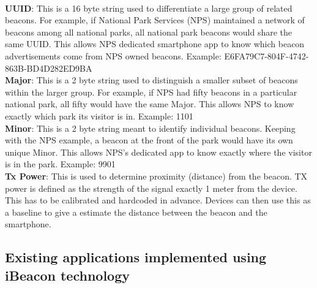 \documentclass[12pt]{article}
\begin{document}
\paragraph{} 
\textbf{UUID}: This is a 16 byte string used to differentiate a large group of related beacons. For example, if National Park Services (NPS) maintained a network of beacons among all national parks, all national park beacons would share the same UUID. This allows NPS dedicated smartphone app to know which beacon advertisements come from NPS owned beacons. Example: E6FA79C7-804F-4742-863B-BD4D282ED9BA \\

\textbf{Major}: This is a 2 byte string used to distinguish a smaller subset of beacons within the larger group. For example, if NPS had fifty beacons in a particular national park, all fifty would have the same Major. This allows NPS to know exactly which park its visitor is in. Example: 1101  \\

\textbf{Minor}: This is a 2 byte string meant to identify individual beacons. Keeping with the NPS example, a beacon at the front of the park would have its own unique Minor. This allows NPS’s dedicated app to know exactly where the visitor is in the park. Example: 9901\\

\textbf{Tx Power}: This is used to determine proximity (distance) from the beacon. TX power is defined as the strength of the signal exactly 1 meter from the device. This has to be calibrated and hardcoded in advance. Devices can then use this as a baseline to give a estimate the distance between the beacon and the smartphone.  \\

\subsection{Existing applications implemented using iBeacon technology}
\end{document}
